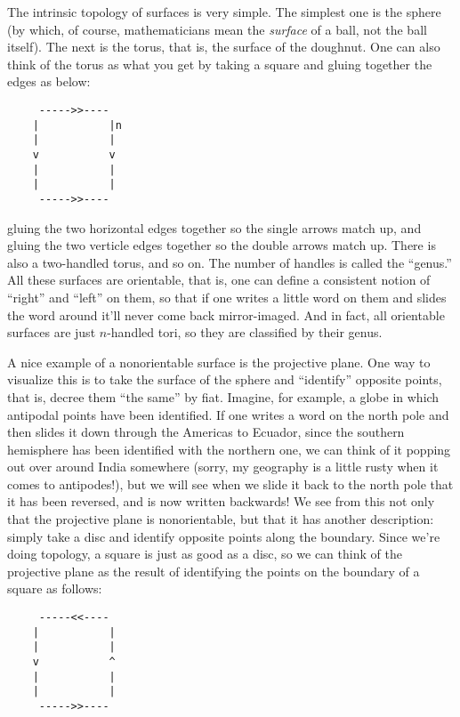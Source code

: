 \documentclass{article}
\begin{document}
The intrinsic topology of surfaces is very simple. The simplest one is
the sphere (by which, of course, mathematicians mean the \emph{surface}
of a ball, not the ball itself). The next is the torus, that is, the
surface of the doughnut. One can also think of the torus as what you get
by taking a square and gluing together the edges as below:

\begin{verbatim}
     ----->>----
    |           |n
    |           |  
    v           v
    |           |
    |           |
     ----->>----
\end{verbatim}

gluing the two horizontal edges together so the single arrows match up,
and gluing the two verticle edges together so the double arrows match
up. There is also a two-handled torus, and so on. The number of handles
is called the ``genus.'' All these surfaces are orientable, that is, one
can define a consistent notion of ``right'' and ``left'' on them, so
that if one writes a little word on them and slides the word around
it'll never come back mirror-imaged. And in fact, all orientable
surfaces are just \(n\)-handled tori, so they are classified by their
genus.

A nice example of a nonorientable surface is the projective plane. One
way to visualize this is to take the surface of the sphere and
``identify'' opposite points, that is, decree them ``the same'' by fiat.
Imagine, for example, a globe in which antipodal points have been
identified. If one writes a word on the north pole and then slides it
down through the Americas to Ecuador, since the southern hemisphere has
been identified with the northern one, we can think of it popping out
over around India somewhere (sorry, my geography is a little rusty when
it comes to antipodes!), but we will see when we slide it back to the
north pole that it has been reversed, and is now written backwards! We
see from this not only that the projective plane is nonorientable, but
that it has another description: simply take a disc and identify
opposite points along the boundary. Since we're doing topology, a square
is just as good as a disc, so we can think of the projective plane as
the result of identifying the points on the boundary of a square as
follows:

\begin{verbatim}
     -----<<----
    |           |
    |           |  
    v           ^
    |           |
    |           |
     ----->>----
\end{verbatim}
\end{document}
